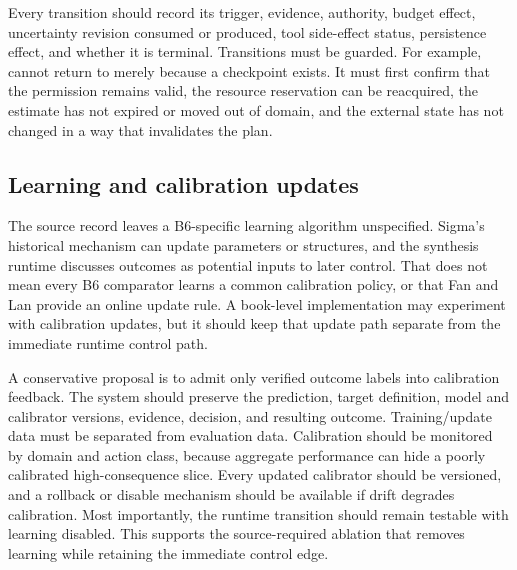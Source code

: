 
Every transition should record its trigger, evidence, authority, budget effect, uncertainty revision consumed or produced, tool side-effect status, persistence effect, and whether it is terminal. Transitions must be guarded. For example, \texttt{} cannot return to \texttt{} merely because a checkpoint exists. It must first confirm that the permission remains valid, the resource reservation can be reacquired, the estimate has not expired or moved out of domain, and the external state has not changed in a way that invalidates the plan.

\subsection{Learning and calibration updates}
\label{sec:ch16-learning}

The source record leaves a B6-specific learning algorithm unspecified. Sigma's historical mechanism can update parameters or structures, and the synthesis runtime discusses outcomes as potential inputs to later control. That does not mean every B6 comparator learns a common calibration policy, or that Fan and Lan provide an online update rule. A book-level implementation may experiment with calibration updates, but it should keep that update path separate from the immediate runtime control path.

A conservative proposal is to admit only verified outcome labels into calibration feedback. The system should preserve the prediction, target definition, model and calibrator versions, evidence, decision, and resulting outcome. Training/update data must be separated from evaluation data. Calibration should be monitored by domain and action class, because aggregate performance can hide a poorly calibrated high-consequence slice. Every updated calibrator should be versioned, and a rollback or disable mechanism should be available if drift degrades calibration. Most importantly, the runtime transition should remain testable with learning disabled. This supports the source-required ablation that removes learning while retaining the immediate control edge.

